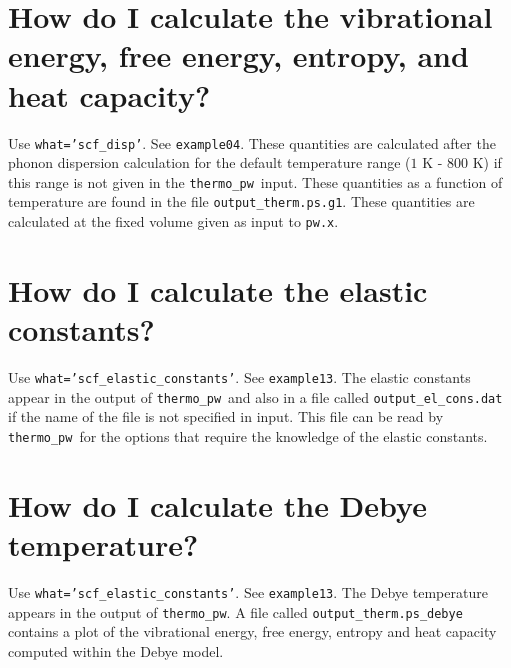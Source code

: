\documentclass[12pt,a4paper]{article}
\def\thermo{\texttt{thermo\_pw}}
\begin{document}
\section{\color{coral}How do I calculate the vibrational energy, free energy, entropy, and heat capacity?}
Use \texttt{what='scf\_disp'}. See \texttt{example04}. These quantities
are calculated after the phonon dispersion calculation for the default 
temperature range ($1$ K - $800$ K) if this range
is not given in the \thermo\ input. These quantities 
as a function of temperature are found in the file \texttt{output\_therm.ps.g1}.
These quantities are calculated at the fixed volume given as input
to \texttt{pw.x}.


\section{\color{coral}How do I calculate the elastic constants?}
Use \texttt{what='scf\_elastic\_constants'}. See \texttt{example13}. The
elastic constants appear in the output of \thermo\ and also in a file
called \texttt{output\_el\_cons.dat} if the name of the file is not
specified in input. This file can be read by \thermo\ for the options
that require the knowledge of the elastic constants.

\section{\color{coral}How do I calculate the Debye temperature?}
Use \texttt{what='scf\_elastic\_constants'}. See \texttt{example13}. The
Debye temperature appears in the output of \thermo. A file called
\texttt{output\_therm.ps\_debye} contains a plot of the vibrational
energy, free energy, entropy and heat capacity computed within the 
Debye model.
\end{document}
